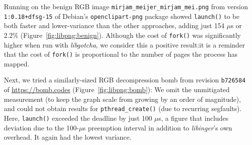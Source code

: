 Running on the benign RGB image \texttt{mirjam\_meijer\_mirjam\_mei.png} from version
\texttt{1:0.18+dfsg-15} of Debian's \texttt{openclipart-png} package showed
\texttt{launch()} to be both faster and lower-variance than the other approaches,
adding just 154 $\mu$s or 2.2\% (Figure~\ref{fig:libpng:benign}).  Although the cost
of \texttt{fork()} was significantly higher when run with \textit{libgotcha}, we
consider this a positive result:\@ it is a reminder that the cost of \texttt{fork()}
is proportional to the number of pages the process has mapped.

Next, we tried a similarly-sized RGB decompression bomb from revision
\texttt{b726584} of \url{https://bomb.codes} (Figure~\ref{fig:libpng:bomb}):  We omit
the unmitigated measurement (to keep the graph scale from growing by an order of
magnitude), and could not obtain results for \texttt{pthread\_create()} (due to
recurring segfaults).  Here, \texttt{launch()} exceeded the deadline by just 100
$\mu$s, a figure that includes deviation due to the 100-$\mu$s preemption interval in
addition to \textit{libinger}'s own overhead.  It again had the lowest variance.

